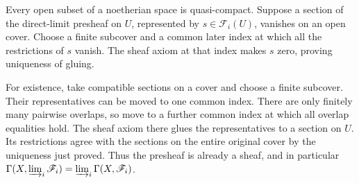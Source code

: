 Every open subset of a noetherian space is quasi-compact. Suppose a section of the direct-limit presheaf on $U$, represented by $s\in\mathscr F_i(U)$, vanishes on an open cover. Choose a finite subcover and a common later index at which all the restrictions of $s$ vanish. The sheaf axiom at that index makes $s$ zero, proving uniqueness of gluing.

For existence, take compatible sections on a cover and choose a finite subcover. Their representatives can be moved to one common index. There are only finitely many pairwise overlaps, so move to a further common index at which all overlap equalities hold. The sheaf axiom there glues the representatives to a section on $U$. Its restrictions agree with the sections on the entire original cover by the uniqueness just proved. Thus the presheaf is already a sheaf, and in particular $\Gamma(X,\varinjlim_i\mathscr F_i)=\varinjlim_i\Gamma(X,\mathscr F_i)$.

